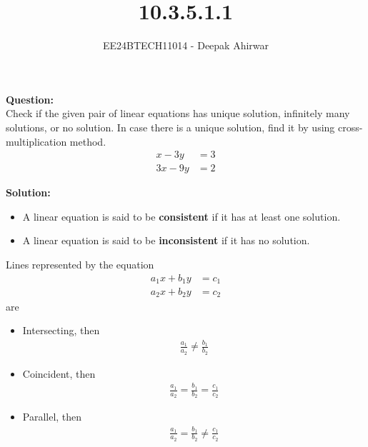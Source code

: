 \documentclass[journal]{IEEEtran}
\numberwithin{equation}{enumi}
\numberwithin{figure}{enumi}
\begin{document}


\title{10.3.5.1.1}
\author{EE24BTECH11014 - Deepak Ahirwar}

{\let\newpage\relax\maketitle}

\textbf{Question:}\\
Check if the given pair of linear equations has unique solution, infinitely many solutions, or no solution. In case there is a unique solution, find it by using cross-multiplication method.
\begin{align}
    x - 3y &= 3\\
    3x - 9y &= 2
\end{align}

\textbf{Solution: }\\

\begin{itemize}
    \item A linear equation is said to be \textbf{consistent} if it has at least one solution.
    \item A linear equation is said to be \textbf{inconsistent} if it has no solution. 
\end{itemize}

Lines represented by the equation
\begin{align}
    a_1x+b_1y &= c_1\\
    a_2x+b_2y &= c_2
\end{align}
are 
\begin{itemize}
\item Intersecting, then
\begin{align}
   \frac{a_1}{a_2} \neq \frac{b_1}{b_2}
\end{align}

\item Coincident, then
\begin{align}
   \frac{a_1}{a_2} = \frac{b_1}{b_2} = \frac{c_1}{c_2}
\end{align}

\item Parallel, then
\begin{align}
   \frac{a_1}{a_2} = \frac{b_1}{b_2} \neq \frac{c_1}{c_2}
\end{align}
\end{itemize}
\end{document}
